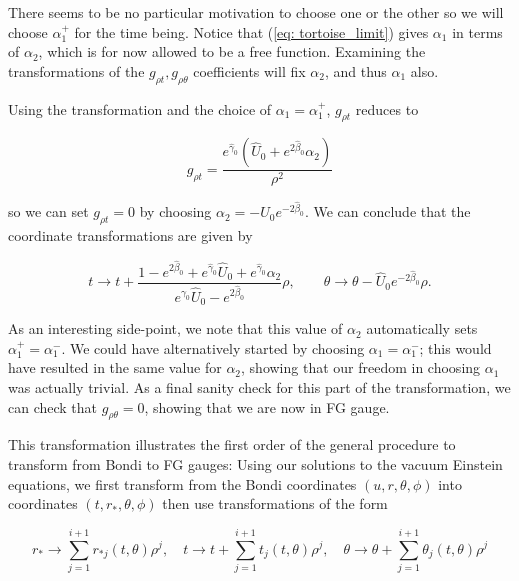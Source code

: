 \documentclass[a4paper,11pt]{article}
\numberwithin{equation}{section}
\begin{document}
\noindent There seems to be no particular motivation to choose one or the other so we will choose $\alpha_{1}^+$ for the time being. Notice that (\ref{eq: tortoise_limit}) gives $\alpha_1$ in terms of $\alpha_2$, which is for now allowed to be a free function. Examining the transformations of the $g_{\rho t}, g_{\rho \theta}$ coefficients will fix $\alpha_2$, and thus $\alpha_1$ also.

Using the transformation and the choice of $\alpha_1=\alpha_1^+$, $g_{\rho t}$ reduces to 

\begin{equation}
g_{\rho t}=\frac{e^{\hat{\gamma}_{0}}(\hat{U}_{0}+e^{2\hat{\beta}_{0}}\alpha_2)}{\rho^2}
\end{equation}

\noindent so we can set $g_{\rho t}=0$ by choosing $\alpha_2=-\hat{U}_{0} e^{-2 \hat{\beta}_{0}}$. We can conclude that the coordinate transformations are given by 

\begin{equation} \label{eq: ttheta_trans}
t \rightarrow t+\frac{1-e^{2\hat{\beta}_{0}}+e^{\hat{\gamma}_{0}}\hat{U}_{0}+e^{\hat{\gamma}_{0}}\alpha_2}{e^{\gamma_{0}}\hat{U}_{0}-e^{2\hat{\beta}_{0}}} \rho, \qquad \theta \rightarrow \theta  -\hat{U}_{0} e^{-2 \hat{\beta}_{0}}\rho.
\end{equation}

As an interesting side-point, we note that this value of $\alpha_2$ automatically sets $\alpha_1^+=\alpha_1^-$. We could have alternatively started by choosing $\alpha_1=\alpha_1^-$; this would have resulted in the same value for $\alpha_2$, showing that our freedom in choosing $\alpha_1$ was actually trivial. As a final sanity check for this part of the transformation, we can check that $g_{\rho \theta}=0$, showing that we are now in FG gauge. \par

This transformation illustrates the first order of the general procedure to transform from Bondi to FG gauges: Using our solutions to the vacuum Einstein equations, we first transform from the Bondi coordinates $(u, r, \theta, \phi)$ into coordinates $(t, r_*, \theta, \phi)$ then use transformations of the form 

\begin{equation}
r_* \rightarrow \sum_{j=1}^{i+1} r_{* j}(t, \theta) \rho^j, \quad t \rightarrow t+ \sum_{j=1}^{i+1}  t_{j}(t, \theta) \rho^j, \quad \theta \rightarrow \theta + \sum_{j=1}^{i+1} \theta_{j}(t, \theta) \rho^j
\end{equation}
\end{document}
